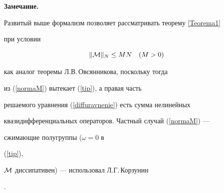 {\bf Замечание.}


Развитый выше формализм позволяет рассматривать теорему \ref{Teorema1}


при условии


\begin{equation}


\label{normaM}


\|{\cal{M}}\|_{N}\leq MN \quad (M>0)


\end{equation}


как аналог теоремы Л.В.\,Овсянникова, поскольку тогда


из (\ref{normaM}) вытекает (\ref{tip}), а правая часть


решаемого уравнения (\ref{diffuravnenie}) есть сумма нелинейных


квазидифференциальных операторов. Частный случай (\ref{normaM}) ---


сжимающие полугруппы ($\omega=0$ в


(\ref{tip}),


${\cal{M}}$ диссипативен) --- использовал Л.Г.\,Корзунин


\cite{SidorovKorzuninFilimonov}.





